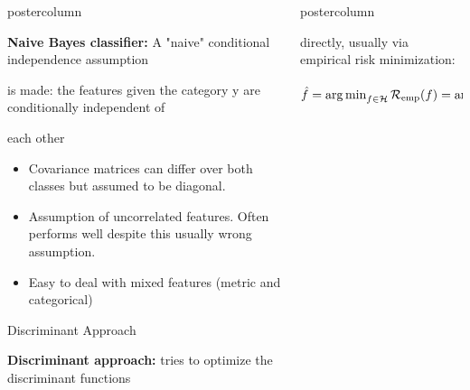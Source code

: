 \documentclass{beamer}
\newlength{\columnheight} %
\begin{document}
\begin{frame}[fragile]{}
\begin{columns}
\begin{column}{.31\textwidth}
\begin{beamercolorbox}[center]{postercolumn}
\begin{minipage}{.98\textwidth}
{\begin{myblock}{}
  \vspace*{1ex}
  
  \begin{codebox}
  \textbf{Naive Bayes classifier: }A "naive" conditional independence assumption
  \end{codebox}

  \begin{codebox}
  is made: the features given the category y are conditionally independent of
  \end{codebox}
  
  \begin{codebox}
  each other
  \end{codebox}
  
  \begin{itemize}[$\bullet$]
    \setlength{\itemindent}{+.3in}
      \item Covariance matrices can differ over both classes but assumed to be diagonal.
      \item Assumption of uncorrelated features. Often performs well despite this usually wrong assumption.
      \item Easy to deal with mixed features (metric and categorical)
  \end{itemize}
  \end{myblock}
  
  \begin{myblock}{Discriminant Approach}
  \begin{codebox}
  \textbf{Discriminant approach: }tries to optimize the discriminant functions
  \end{codebox}
  \end{myblock}
  }
  \end{minipage}
		\end{beamercolorbox}
	\end{column}
	
	
	\begin{column}{.31\textwidth}
	\begin{beamercolorbox}[center]{postercolumn}
	
	\begin{minipage}{.98\textwidth}
  \parbox[t][\columnheight]{\textwidth}{
  \begin{myblock}{}
    
  \begin{codebox}
  directly, usually via empirical risk minimization:
  \end{codebox}
    
  $ \hat{f} = \mathop{\mathrm{arg\,min}}_{f \in \mathcal{H}} \mathcal{R}_{\text{emp}}(f) = \mathop{\mathrm{arg\,min}}_{f \in \mathcal{H}} \sum\limits_{i=1}^n L\left(y^{(i)}, f\left(\mathbf{x}^{(i)}\right)\right).$
  

\end{myblock}}
\end{minipage}
\end{beamercolorbox}
\end{column}
\end{columns}
\end{frame}
\end{document}
